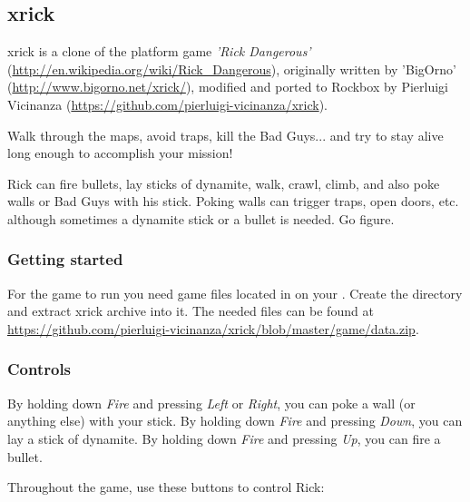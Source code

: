 \subsection{xrick}
xrick is a clone of the platform game
\emph{'Rick Dangerous'}
(\url{http://en.wikipedia.org/wiki/Rick_Dangerous}),
originally written by 'BigOrno'
(\url{http://www.bigorno.net/xrick/}),
modified and ported to Rockbox by Pierluigi Vicinanza
(\url{https://github.com/pierluigi-vicinanza/xrick}).

Walk through the maps, avoid traps, kill the Bad Guys... and
try to stay alive long enough to accomplish your mission!

Rick can fire bullets, lay sticks of dynamite, walk, crawl,
climb, and also poke walls or Bad Guys with his stick.
Poking walls can trigger traps, open doors, etc. although
sometimes a dynamite stick or a bullet is needed.
Go figure.

\subsubsection{Getting started}
For the game to run you need  game files located in
 on your \dap.
Create the directory and extract xrick  archive into it.
The needed files can be found at
\url{https://github.com/pierluigi-vicinanza/xrick/blob/master/game/data.zip}.

\subsubsection{Controls}
By holding down \emph{Fire} and pressing \emph{Left} or \emph{Right},
you can poke a wall (or anything else) with your stick.
By holding down \emph{Fire} and pressing \emph{Down}, you can lay a stick of dynamite.
By holding down \emph{Fire} and pressing \emph{Up}, you can fire a bullet.

Throughout the game, use these buttons to control Rick:


